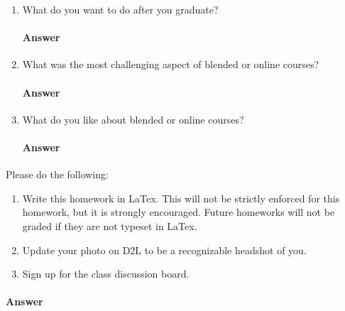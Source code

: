 \documentclass{article}
\begin{document}
\begin{enumerate}
    \item What do you want to do after you graduate?
        \paragraph{Answer} 

    \item What was the most challenging aspect of blended or online courses?
        \paragraph{Answer} 

    \item What do you like about blended or online courses?
        \paragraph{Answer} 

\end{enumerate}


Please do the following:
\begin{enumerate}
    \item Write this homework in LaTex. This will not be strictly enforced for
        this homework, but it is strongly encouraged.  Future homeworks will not
        be graded if they are not typeset in LaTex.
    \item Update your photo on D2L to be a recognizable headshot of you.
    \item Sign up for the class discussion board.
\end{enumerate}

\paragraph{Answer}


\end{document}
